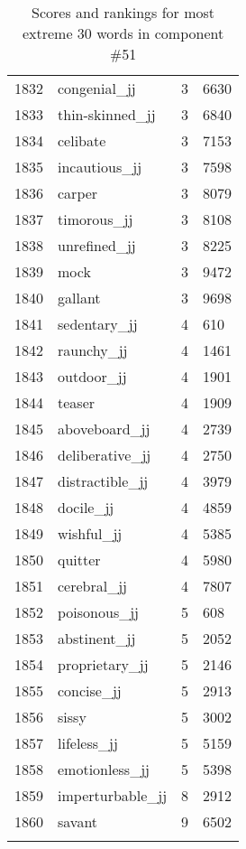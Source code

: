 \begin{longtable}[!htbp]{| rlr@{.}l |}
    1832 & congenial\_jj & 3 & 6630 \\
    1833 & thin-skinned\_jj & 3 & 6840 \\
    1834 & celibate & 3 & 7153 \\
    1835 & incautious\_jj & 3 & 7598 \\
    1836 & carper & 3 & 8079 \\
    1837 & timorous\_jj & 3 & 8108 \\
    1838 & unrefined\_jj & 3 & 8225 \\
    1839 & mock & 3 & 9472 \\
    1840 & gallant & 3 & 9698 \\
    1841 & sedentary\_jj & 4 & 610 \\
    1842 & raunchy\_jj & 4 & 1461 \\
    1843 & outdoor\_jj & 4 & 1901 \\
    1844 & teaser & 4 & 1909 \\
    1845 & aboveboard\_jj & 4 & 2739 \\
    1846 & deliberative\_jj & 4 & 2750 \\
    1847 & distractible\_jj & 4 & 3979 \\
    1848 & docile\_jj & 4 & 4859 \\
    1849 & wishful\_jj & 4 & 5385 \\
    1850 & quitter & 4 & 5980 \\
    1851 & cerebral\_jj & 4 & 7807 \\
    1852 & poisonous\_jj & 5 & 608 \\
    1853 & abstinent\_jj & 5 & 2052 \\
    1854 & proprietary\_jj & 5 & 2146 \\
    1855 & concise\_jj & 5 & 2913 \\
    1856 & sissy & 5 & 3002 \\
    1857 & lifeless\_jj & 5 & 5159 \\
    1858 & emotionless\_jj & 5 & 5398 \\
    1859 & imperturbable\_jj & 8 & 2912 \\
    1860 & savant & 9 & 6502 \\
    \hline
    \caption{Scores and rankings for most extreme 30 words in component \#51} \\
\end{longtable}
